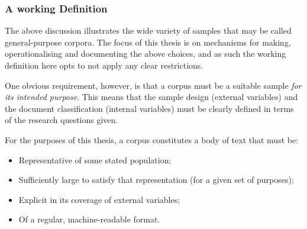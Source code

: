 \subsubsection{A working Definition}
The above discussion illustrates the wide variety of samples that may be called general-purpose corpora.  The focus of this thesis is on mechanisms for making, operationalising and documenting the above choices, and as such the working definition here opts to not apply any clear restrictions.

One obvious requirement, however, is that a corpus must be a suitable sample \textsl{for its intended purpose}.  This means that the sample design (external variables) and the document classification (internal variables) must be clearly defined in terms of the research questions given.

For the purposes of this thesis, a corpus constitutes a body of text that must be:

\begin{itemize}
    \item Representative of some stated population;
    \item Sufficiently large to satisfy that representation (for a given set of purposes);
    \item Explicit in its coverage of external variables;
    \item Of a regular, machine-readable format.
\end{itemize}


% 
% 
% 
% 
% 












